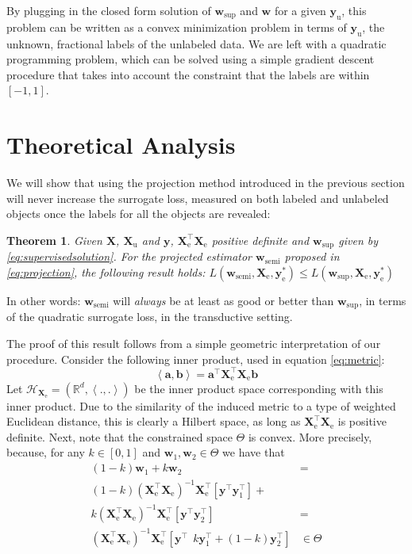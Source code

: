 \documentclass{article}
\newcommand{\Xe}{\vec{X}_\mathrm{e}  }
\newcommand{\XeT}{\vec{X}_\mathrm{e}^\top}
\newcommand{\G}{\left(\Xe^\top \Xe \right)^{-1}}
\newtheorem{theorem}{Theorem}[section]
\renewcommand{\vec}[1]{\mathbf{#1}}
\begin{document}
By plugging in the closed form solution of $\vec{w}_\text{sup}$ and $\vec{w}$ for a given $\vec{y}_\text{u}$, this problem can be written as a convex minimization problem in terms of $\vec{y}_\text{u}$, the unknown, fractional labels of the unlabeled data. We are left with a quadratic programming problem, which can be solved using a simple gradient descent procedure that takes into account the constraint that the labels are within $[-1,1]$.

\section{Theoretical Analysis}
\label{TheoreticalResults}

We will show that using the projection method introduced in the previous section will never increase the surrogate loss, measured on both labeled and unlabeled objects once the labels for all the objects are revealed:
\begin{theorem}
\label{th:robustness}
Given $\vec{X}$, $\vec{X}_\mathrm{u}$ and $\vec{y}$, $\Xe^\top \Xe$ positive definite and $\vec{w}_\mathrm{sup}$ given by \eqref{eq:supervisedsolution}. For the projected estimator $\vec{w}_\mathrm{semi}$ proposed in \eqref{eq:projection}, the following result holds:
$L(\vec{w}_\mathrm{semi},\Xe,\vec{y}_\mathrm{e}^{\ast}) \leq L(\vec{w}_\mathrm{sup},\Xe,\vec{y}_\mathrm{e}^{\ast}) $
\end{theorem}
In other words: $\vec{w}_\text{semi}$ will \emph{always} be at least as good or better than $\vec{w}_\text{sup}$, in terms of the quadratic surrogate loss, in the transductive setting.

The proof of this result follows from a simple geometric interpretation of our procedure. Consider the following inner product, used in equation \eqref{eq:metric}:
\begin{equation}
\left\langle \vec{a}, \vec{b} \right\rangle = \vec{a}^\top \vec{X}_\text{e}^\top \vec{X}_\text{e} \vec{b}
\end{equation}
Let $\mathcal{H}_{\vec{X}_\text{e}} = ( \mathbb{R}^d,\left\langle ., . \right\rangle )$ be the inner product space corresponding with this inner product. Due to the similarity of the induced metric to a type of weighted Euclidean distance, this is clearly a Hilbert space, as long as $\XeT \Xe$ is positive definite. Next, note that the constrained space $\Theta$ is convex. More precisely, because, for any $k \in [0,1]$ and $\vec{w}_\text{1},\vec{w}_\text{2} \in \Theta$ we have that
\begin{align}
(1-k) \vec{w}_\text{1} + k \vec{w}_\text{2} & = \nonumber \\
(1-k) \G \XeT \left[\vec{y}^\top \vec{y}_\text{1}^\top \right] + & \nonumber \\ 
 k \G \XeT \left[\vec{y}^\top \vec{y}_\text{2}^\top \right] & = \nonumber \\ 
\G \XeT \left[\vec{y}^\top ~~ k \vec{y}_\text{1}^\top + (1-k) \vec{y}_\text{2}^\top \right] & \in \Theta \nonumber
\end{align}
\end{document}
